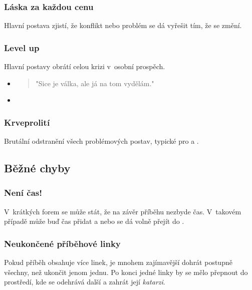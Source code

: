 \subsubsection{ Láska za každou cenu } Hlavní postava zjistí, že konflikt nebo problém se dá vyřešit tím, že se změní. 
 
\subsubsection{ Level up } Hlavní postavy obrátí celou krizi v~osobní prospěch. 
 
\begin{itemize}
\item  \begin{quote}"Sice je válka, ale já na tom vydělám."\end{quote}
\item  \begin{quote} \end{quote}
\end{itemize}
 
\subsubsection{ Krveprolití } Brutální odstranění všech problémových postav, typické pro  a . 
 
 
\subsection{ Běžné chyby }  
\subsubsection{ Není čas! } V~krátkých forem se může stát, že na závěr příběhu nezbyde čas. V~takovém případě může buď  čas přidat a nebo se dá volně přejít do . 
 
\subsubsection{ Neukončené příběhové linky } Pokud příběh obsahuje více linek, je mnohem zajímavější dohrát postupně všechny, než ukončit jenom jednu. Po konci jedné linky by se mělo přepnout do prostředí, kde se odehrává další a zahrát její \textit{katarzi}. 
 
 
 
